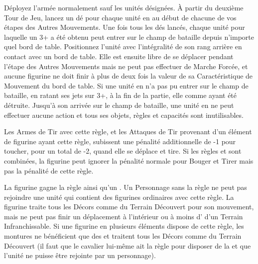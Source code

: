  Déployez l'armée normalement sauf les unités désignées. À partir du deuxième Tour de Jeu, lancez un dé pour chaque unité en \ambush{} au début de chacune de vos étapes des Autres Mouvements. Une fois tous les dés lancés, chaque unité pour laquelle un 3+ a été obtenu peut entrer sur le champ de bataille depuis n'importe quel bord de table. Positionnez l'unité avec l'intégralité de son rang arrière en contact avec un bord de table. Elle est ensuite libre de se déplacer pendant l'étape des Autres Mouvements mais ne peut pas effectuer de Marche Forcée, et aucune figurine ne doit finir à plus de deux fois la valeur de sa Caractéristique de Mouvement du bord de table. Si une unité en \ambush{} n'a pas pu entrer sur le champ de bataille, en ratant ses jets sur 3+, à la fin de la partie, elle comme ayant été détruite.  Jusqu'à son arrivée sur le champ de bataille, une unité en \ambush{} ne peut effectuer aucune action et tous ses objets, règles et capacités sont inutilisables.


Les Armes de Tir avec cette règle, et les Attaques de Tir provenant d'un élément de figurine ayant cette règle, subissent une pénalité additionnelle de -1 pour toucher, pour un total de -2, quand elle se déplace et tire. Si les règles \unwieldy{} et \quicktofire{} sont combinées, la figurine peut ignorer la pénalité normale pour Bouger et Tirer mais pas la pénalité de cette règle.


La figurine gagne la règle \magicalattacks{} ainsi qu'un . Un Personnage sans la règle \ethereal{} ne peut pas rejoindre une unité qui contient des figurines ordinaires avec cette règle. La figurine traite tous les Décors comme du Terrain Découvert pour son mouvement, mais ne peut pas finir un déplacement à l'intérieur ou à moins d' d'un Terrain Infranchissable. Si une figurine en plusieurs éléments dispose de cette règle, les montures ne bénéficient que des \magicalattacks{} et traitent tous les Décors comme du Terrain Découvert (il faut que le cavalier lui-même ait la règle \ethereal{} pour disposer de la \wardsave{} et que l'unité ne puisse être rejointe par un personnage).

